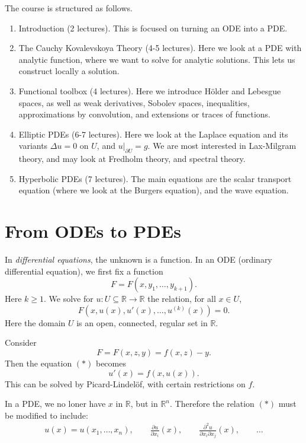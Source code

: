 \documentclass[12pt]{article}
\begin{document}
The course is structured as follows.
\begin{enumerate}[label=Chapter \arabic*.]
	\item Introduction (2 lectures). This is focused on turning an ODE into a PDE.
	\item The Cauchy Kovalevskoya Theory (4-5 lectures). Here we look at a PDE with analytic function, where we want to solve for analytic solutions. This lets us construct locally a solution.
	\item Functional toolbox (4 lectures). Here we introduce H\"older and Lebesgue spaces, as well as weak derivatives, Sobolev spaces, inequalities, approximations by convolution, and extensions or traces of functions.
	\item Elliptic PDEs (6-7 lectures). Here we look at the Laplace equation and its variants $\Delta u = 0$ on $U$, and $u |_{\partial U} = g$. We are most interested in Lax-Milgram theory, and may look at Fredholm theory, and spectral theory.
	\item Hyperbolic PDEs (7 lectures). The main equations are the scalar transport equation (where we look at the Burgers equation), and the wave equation.
\end{enumerate}

\newpage

\section{From ODEs to PDEs}%
\label{sec:ode2pde}

In \emph{differential equations}, the unknown is a function. In an ODE (ordinary differential equation), we first fix a function
\[
F = F(x, y_1, \ldots, y_{k+1}).
\]
Here $k \geq 1$. We solve for $u : U \subseteq \mathbb{R} \to \mathbb{R}$ the relation, for all $x \in U$,
\[
F(x, u(x), u'(x), \ldots, u^{(k)}(x)) = 0. \tag{$\ast$}
\]
Here the domain $U$ is an open, connected, regular set in $\mathbb{R}$.

\begin{exbox}
	Consider
	\[
	F = F(x, z, y) = f(x, z) - y.
	\]
	Then the equation $(\ast)$ becomes
	\[
	u'(x) = f(x, u(x)).
	\]
	This can be solved by Picard-Lindel\"of, with certain restrictions on $f$.
\end{exbox}

In a PDE, we no loner have $x$ in $\mathbb{R}$, but in $\mathbb{R}^n$. Therefore the relation $(\ast)$ must be modified to include:
\begin{align*}
	u(x) = u(x_1, \ldots, x_n), \qquad \frac{\partial u}{\partial x_i} (x), \qquad \frac{\partial^2 u}{\partial x_i \partial x_j} (x), \qquad \ldots
\end{align*}
\end{document}
